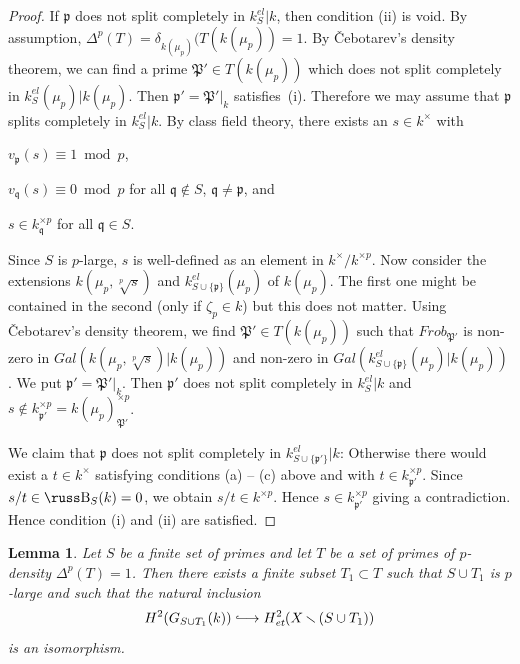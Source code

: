 \documentclass[10pt]{article}
\def\injr#1{\stackrel{#1}{\lhook\joinrel\relbar\joinrel\rightarrow}}
\newcommand{\Frob}{{\mathit{Frob}}}
\newcommand{\p}{{\mathfrak p}}
\newcommand{\q}{{\mathfrak q}}
\newcommand{\sm}{{\,\smallsetminus\,}}
\newcommand{\et}{\text{\it et}}
\renewcommand{\P}{\mathfrak{P}}
\def\Be{\hbox{\russ\char66}}
\theoremstyle{alex}
\newtheorem{lemma}[theorem]{Lemma}
\theoremstyle{alexdef}
\begin{document}
\begin{proof}
If $\p$ does not split completely in $k_S^{el}|k$, then condition (ii) is void. By assumption, $\varDelta^p(T)=\delta_{k(\mu_p)}(T(k(\mu_p))=1$. By \v Cebotarev's density theorem, we can find a prime $\P'\in T(k(\mu_p))$ which does not split completely in $k_S^{el}(\mu_p)|k(\mu_p)$. Then $\p'=\P'|_k$ satisfies~(i). Therefore we may assume that $\p$ splits completely in $k_S^{el}|k$. By class field theory, there exists an $s\in k^\times$ with

\smallskip
\begin{compactenum}
\item[\rm (a)] $v_\p(s)\equiv 1 \bmod p$,
\item[\rm (b)] $v_\q(s) \equiv 0 \bmod p$ for all $\q\notin S$, $\q \neq \p$, and
\item[\rm (c)] $s\in k_\q^{\times p}$ for all $\q \in S$.
\end{compactenum}

\smallskip\noindent
Since $S$ is $p$-large, $s$ is well-defined as an element in $k^\times/k^{\times p}$.  Now consider the extensions $k(\mu_p, \sqrt[p]{s})$ and $k_{S\cup\{\p\}}^{el}(\mu_p)$ of $k(\mu_p)$. The first one might be contained in the second (only if  $\zeta_p\in k$) but this does not matter.
Using \v Cebotarev's density theorem, we find $\P'\in T(k(\mu_p))$ such that $\Frob_{\P'}$ is non-zero in $Gal(k(\mu_p, \sqrt[p]{s})|k(\mu_p))$ and non-zero in $Gal(k_{S\cup\{\p\}}^{el}(\mu_p)|k(\mu_p))$. We put $\p'=\P'|_k$. Then $\p'$ does not split completely in $k_S^{el}|k$ and  $s\notin  k_{\p'}^{\times p}=k(\mu_p)_{\P'}^{\times p}$.

We claim that $\p$ does not split completely in $k_{S\cup \{\p'\}}^{el}|k$: Otherwise there would exist a $t \in k^\times$ satisfying conditions (a) -- (c) above and with $t \in k_{\p'}^{\times p}$. Since $s/t\in \Be_S(k)=0$, we obtain $s/t \in k^{\times p}$. Hence $s\in k_{\p'}^{\times p}$ giving a contradiction. Hence condition (i) and (ii) are satisfied.
\end{proof}


\begin{lemma}\label{extlemma1}
Let $S$ be a finite set of primes and let $T$ be a set of primes of $p$-density $\varDelta^p(T)=1$.  Then there exists a finite subset $T_1\subset T$  such that $S\cup T_1$ is $p$-large and such that the natural inclusion
\[
H^2(G_{S\cup T_1}(k)) \injr{} H^2_\et(X\sm (S\cup T_1))
\]
is an isomorphism.
\end{lemma}
\end{document}
